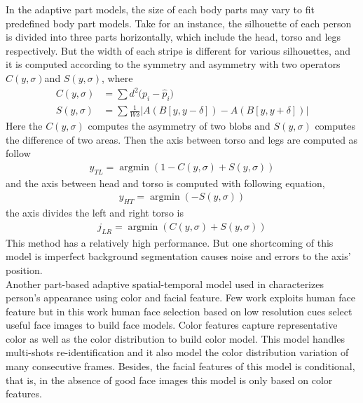 In the adaptive part models, the size of each body parts may vary to fit predefined body part models. Take \cite{SDALF} for an instance, the silhouette of each person is divided into three parts horizontally, which include the head, torso and legs respectively. But the width of each stripe is different for various silhouettes, and it is computed according to the symmetry and asymmetry with two operators $C(y, \sigma) $and $S(y,\sigma)$, where 
\begin{equation}
\begin{aligned}
C(y,\sigma) & = \sum{d^2(p_i-{\hat{p}_i)}} \\
S(y,\sigma) &= \sum{\frac{1}{W\delta}|A(B[y,y-\delta]) - A(B[y,y+\delta])|}
\end{aligned}
\end{equation}
Here the $C(y, \sigma)$ computes the asymmetry of two blobs and $S(y,\sigma)$ computes the difference of two areas. Then the axis between torso and legs are computed as follow
\begin{equation}
\begin{aligned}
y_{TL} = \mathop{\arg\min}(1-C(y,\sigma)+S(y,\sigma))
\end{aligned}
\end{equation}
and the axis  between head and torso is computed with following equation,
\begin{equation}
\begin{aligned}
y_{HT} = \mathop{\arg\min}(-S(y,\sigma))
\end{aligned}
\end{equation}
the axis divides the left and right torso is
\begin{equation}
\begin{aligned}
j_{LR} = \mathop{\arg\min}(C(y,\sigma)+S(y,\sigma))
\end{aligned}
\end{equation}
This method has a relatively high performance. But one shortcoming of this model is imperfect background segmentation causes noise and errors to the axis' position. \\
\indent Another part-based adaptive spatial-temporal model used in \cite{PartbasedSTReid} characterizes person's appearance using color and facial feature. Few work exploits human face feature but in this work human face selection based on low resolution cues select useful face images to build face models. Color features capture representative color as well as the color distribution to build color model. This model handles multi-shots re-identification and it also model the color distribution variation of many consecutive frames.  Besides, the facial features of this model is conditional, that is, in the absence of good face images this model is only based on color features.

